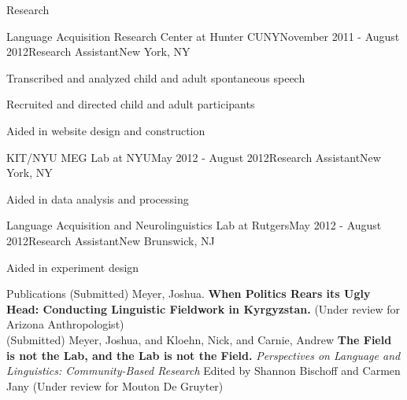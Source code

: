\documentclass{resume} %
\begin{document}
\begin{rSection}{Research}
\begin{rSubsection}{Language Acquisition Research Center at Hunter CUNY}{November 2011 - August 2012}{Research Assistant}{New York, NY}
\item Transcribed and analyzed child and adult spontaneous speech	
\item Recruited and directed child and adult participants
\item Aided in website design and construction
\end{rSubsection}

\begin{rSubsection}{KIT/NYU MEG Lab at NYU}{May 2012 - August 2012}{Research Assistant}{New York, NY}
\item Aided in data analysis and processing
\end{rSubsection}

\begin{rSubsection}{Language Acquisition and Neurolinguistics Lab at Rutgers}{May 2012 - August 2012}{Research Assistant}{New Brunswick, NJ}
\item Aided in experiment design
\end{rSubsection}

\end{rSection}



\vspace{.8cm}



\begin{rSection}{Publications}
{(Submitted)} {Meyer, Joshua.} {\bf When Politics Rears its Ugly Head: Conducting Linguistic Fieldwork in Kyrgyzstan.} \hfill {(Under review for Arizona Anthropologist)} \\

{(Submitted)} {Meyer, Joshua, and Kloehn, Nick, and Carnie, Andrew} {\bf The Field is not the Lab, and the Lab is not the Field.} {\it Perspectives on Language and Linguistics: Community-Based Research} {Edited by Shannon Bischoff and Carmen Jany} \hfill {(Under review for Mouton De Gruyter)} \\

\end{rSection}
\end{document}
